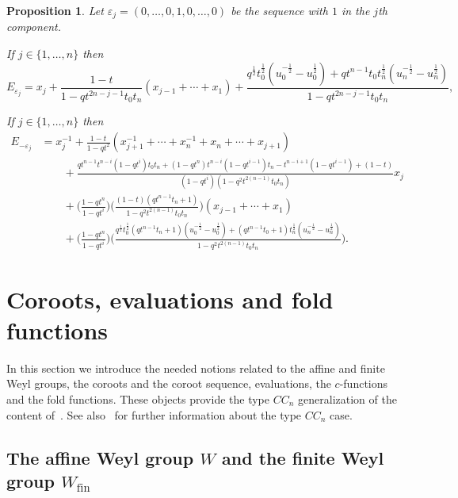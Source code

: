 \documentclass[11pt]{article}
\theoremstyle{plain}
\newtheorem{prop}[thm]{Proposition}
\theoremstyle{definition}
\theoremstyle{remark}
\numberwithin{equation}{section}
\newcounter{r}
\newcounter{s}
\begin{document}
\begin{prop} \label{Emu1box}  Let $\varepsilon_j = (0,\ldots, 0, 1, 0, \ldots, 0)$ be the sequence
with $1$ in the $j$th component.
\item[(a)] 
If $j\in \{1, \ldots, n\}$ then
$$E_{\varepsilon_j} 
= x_j +\frac{1-t}{1-qt^{2n-j-1}t_0t_n}  (x_{j-1}+\cdots + x_1)  
+ \frac{ q^{\frac12}t_0^{\frac12}(u_0^{-\frac12} - u_0^{\frac12})
+qt^{n-1} t_0 t_n^{\frac12}(u_n^{-\frac12} - u_n^{\frac12}) }{1-qt^{2n-j-1}t_0t_n},
$$
\item[(b)] 
If $j\in \{1, \ldots, n\}$ then
\begin{align*}
E_{-\varepsilon_j} 
&= x^{-1}_j + \frac{1-t}{1-qt^2} (x_{j+1}^{-1}+\cdots +x_n^{-1} + x_n+\cdots +x_{j+1}) \\
&\qquad +  \frac{ qt^{n-1}t^{n-i}(1-qt^i)t_0t_n +(1-qt^n) t^{n-i}(1-qt^{i-1}) t_n 
-t^{n-i+1}(1-qt^{i-1}) +(1-t) }
{ (1-qt^i) (1- q^2t^{2(n-1)} t_0t_n)} x_j \\
&\qquad + \Big(\frac{1-qt^n}{1-qt^i}\Big)\Big( \frac{
(1-t)(qt^{n-1}t_n+1)}{1-q^2t^{2(n-1)}t_0t_n} \Big) (x_{j-1}+\cdots+x_1) \\
&\qquad + \Big(\frac{1-qt^n}{1-qt^i}\Big)\Big( \frac{
q^{\frac12}t_0^{\frac12} (qt^{n-1}t_n+1)(u_0^{-\frac12} - u_0^{\frac12}) 
+(qt^{n-1}t_0 + 1) t_n^{\frac12} (u_n^{-\frac12}-u_n^{\frac12}) }
{1-q^2t^{2(n-1)}t_0t_n}\Big).
\end{align*}
\end{prop}

\section{Coroots, evaluations and fold functions}\label{sec: c-functions}

In this section we introduce the needed notions related to the affine and finite Weyl groups, the coroots and the coroot sequence, evaluations, the $c$-functions and the fold functions. 
These objects provide the type $CC_{n}$ generalization of the content of~\cite[\S 2]{GR21}.  See also~\cite[\S2]{CR24} 
for further information about the type $CC_{n}$ case.  

\subsection{The affine Weyl group $W$ and the finite Weyl group $W_{\mathrm{fin}}$}
\label{sec:WeylGroups}
\end{document}
